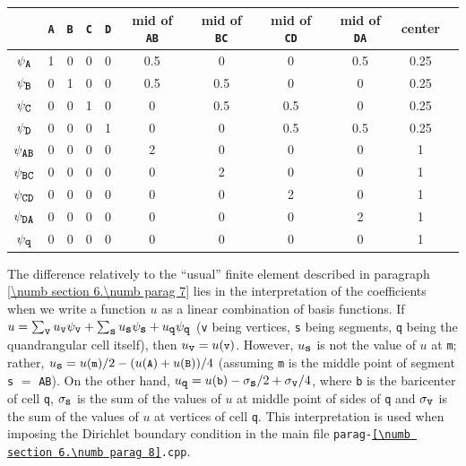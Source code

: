 \begin{center}\begin{tabular}{ | c || c | c | c | c | c | c | c | c | c | c | }
  \hline
  & {\small\tt A} & {\small\tt B} & {\small\tt C} & {\small\tt D} & mid of {\small\tt AB} &
  mid of {\small\tt BC} & mid of {\small\tt CD} & mid of {\small\tt DA} & center
  \\ \hline\hline
  $ \psi_{\mbox{\small\tt A}} $ & 1 & 0 & 0 & 0 & 0.5 & 0 & 0 & 0.5 & 0.25
  \\ \hline
  $ \psi_{\mbox{\small\tt B}} $ & 0 & 1 & 0 & 0 & 0.5 & 0.5 & 0 & 0 & 0.25
  \\ \hline
  $ \psi_{\mbox{\small\tt C}} $ & 0 & 0 & 1 & 0 & 0 & 0.5 & 0.5 & 0 & 0.25
  \\ \hline
  $ \psi_{\mbox{\small\tt D}} $ & 0 & 0 & 0 & 1 & 0 & 0 & 0.5 & 0.5 & 0.25
  \\ \hline
  $ \psi_{\mbox{\small\tt AB}} $ & 0 & 0 & 0 & 0 & 2 & 0 & 0 & 0 & 1
  \\ \hline
  $ \psi_{\mbox{\small\tt BC}} $ & 0 & 0 & 0 & 0 & 0 & 2 & 0 & 0 & 1
  \\ \hline
  $ \psi_{\mbox{\small\tt CD}} $ & 0 & 0 & 0 & 0 & 0 & 0 & 2 & 0 & 1
  \\ \hline
  $ \psi_{\mbox{\small\tt DA}} $ & 0 & 0 & 0 & 0 & 0 & 0 & 0 & 2 & 1
  \\ \hline
  $ \psi_{\mbox{\small\tt q}} $ & 0 & 0 & 0 & 0 & 0 & 0 & 0 & 0 & 1
  \\ \hline
\end{tabular}\end{center}

The difference relatively to the ``usual'' finite element described in paragraph
\ref{\numb section 6.\numb parag 7} lies in the interpretation
of the coefficients when we write a function $u$ as a linear combination of basis functions.
If $ u = \sum_{\mbox{\small\tt v}} u_{\mbox{\small\tt v}} \psi_{\mbox{\small\tt v}} +
\sum_{\mbox{\small\tt s}} u_{\mbox{\small\tt s}} \psi_{\mbox{\small\tt s}} +
u_{\mbox{\small\tt q}} \psi_{\mbox{\small\tt q}} $
({\small\tt v} being vertices, {\small\tt s} being segments, {\small\tt q} being the quandrangular
cell itself), then $ u_{\mbox{\small\tt v}} = u(\mbox{\small\tt v}) $.
However, $ u_{\mbox{\small\tt s}} $ is not the value of $u$ at {\small\tt m};
rather, $ u_{\mbox{\small\tt s}} = u(\mbox{\small\tt m}) / 2 - ( u(\mbox{\small\tt A}) +
u(\mbox{\small\tt B}) ) / 4 $ (assuming {\small\tt m} is the middle point of segment
{\small\tt s} $=$ {\small\tt AB}).
On the other hand, $ u_{\mbox{\small\tt q}} = u(\mbox{\small\tt b}) -
\sigma_{\mbox{\small\tt s}}/2 + \sigma_{\mbox{\small\tt v}}/4 $,
where {\small\tt b} is the baricenter of cell {\small\tt q},
$ \sigma_{\mbox{\small\tt s}} $ is the sum of the values of $u$ at middle point of sides of
{\small\tt q} and $ \sigma_{\mbox{\small\tt v}} $ is the sum of the values of $u$ at vertices
of cell {\small\tt q}.
This interpretation is used when imposing the Dirichlet boundary condition in the main file
{\small\tt parag-\ref{\numb section 6.\numb parag 8}.cpp}.

